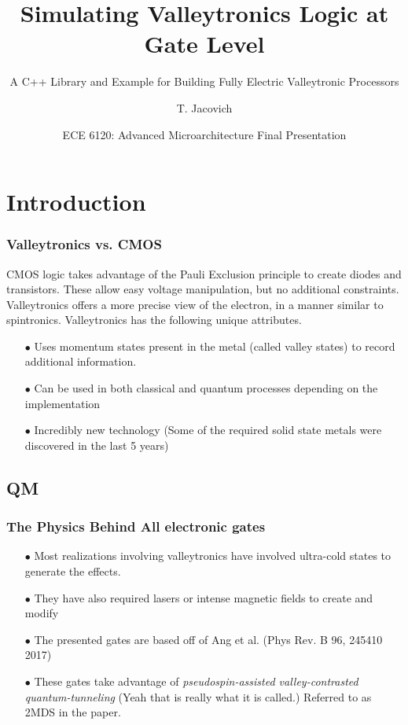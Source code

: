 \documentclass{beamer}
\title[Simulating Valleytronics Logic at the Gate Level] %
{Simulating Valleytronics Logic at Gate Level}
\subtitle{A C++ Library and Example for Building Fully Electric Valleytronic Processors}
\author[] %
{T. Jacovich\inst{1}}
\institute[Universities Here and There] %
{
  \inst{1}%
  Department of Physics\\
  The George Washington University
}
\date[AM2018] %
{ECE 6120: Advanced Microarchitecture Final Presentation}
\begin{document}
\frame{\titlepage}
  \section[Introduction]{Introduction}
  \begin{frame}
    \frametitle{Valleytronics vs. CMOS}
    \small CMOS logic takes advantage of the Pauli Exclusion principle to create diodes and transistors. These allow easy voltage manipulation, but no additional constraints. Valleytronics offers a more precise view of the electron, in a manner similar to spintronics.  Valleytronics has the following unique attributes.

    \begin{itemize}
    \item[$\bullet$] Uses momentum states present in the metal (called valley states) to record additional information.
    
  \item[$\bullet$] Can be used in both classical and quantum processes depending on the implementation
  
  \item[$\bullet$] Incredibly new technology (Some of the required solid state metals were discovered in the last 5 years)
\end{itemize}
\vspace*{20pt}
 
\vspace*{20pt}
  \end{frame}
  
    \subsection[Warning: Quantum Physics]{QM}
    \begin{frame}
    \frametitle{The Physics Behind All electronic gates}

\begin{itemize}
  \item[$\bullet$]Most realizations involving valleytronics have involved ultra-cold states to generate the effects.
  
  \item[$\bullet$]They have also required lasers or intense magnetic fields to create and modify
  
  \item[$\bullet$]The presented gates are based off of Ang et al. (Phys Rev. B 96, 245410 2017)
  
 \item[$\bullet$ ]These gates take advantage of \textit{pseudospin-assisted valley-contrasted quantum-tunneling} (Yeah that is really what it is called.)  Referred to as 2MDS in the paper.
 
\end{itemize}

\end{frame}
  
\end{document}
